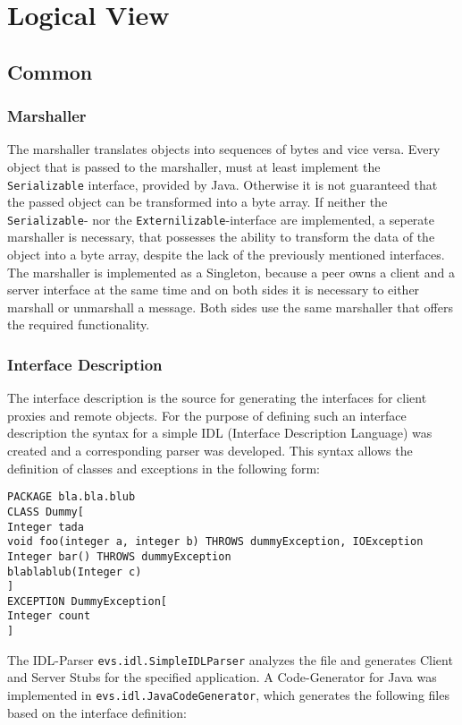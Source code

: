 \section{Logical View}

\cite{zdun2008}

\subsection{Common}
\subsubsection{Marshaller}
The marshaller translates objects into sequences of bytes and vice versa. Every object that is passed to the marshaller, must at least implement the \texttt{Serializable} interface, provided by Java. Otherwise it is not guaranteed that the passed object can be transformed into a byte array. If neither the \texttt{Serializable}- nor the \texttt{Externilizable}-interface are implemented, a seperate marshaller is necessary, that possesses the ability to transform the data of the object into a byte array, despite the lack of the previously mentioned interfaces. The marshaller is implemented as a Singleton, because a peer owns a client and a server interface at the same time and on both sides it is necessary to either marshall or unmarshall a message. Both sides use the same marshaller that offers the required functionality.

\subsubsection{Interface Description}
The interface description is the source for generating the interfaces for client proxies and remote objects. For the purpose of defining such an interface description the syntax for a simple IDL (Interface Description Language) was created and a corresponding parser was developed. This syntax allows the definition of classes and exceptions in the following form:

\begin{code}
\begin{verbatim}
PACKAGE bla.bla.blub
CLASS Dummy[
Integer tada
void foo(integer a, integer b) THROWS dummyException, IOException
Integer bar() THROWS dummyException
blablablub(Integer c)
]
EXCEPTION DummyException[
Integer count
]
\end{verbatim}
\end{code}

The IDL-Parser \texttt{evs.idl.SimpleIDLParser} analyzes the file and generates Client and Server Stubs for the specified application. A Code-Generator for Java was implemented in \texttt{evs.idl.JavaCodeGenerator}, which generates the following files based on the interface definition:

